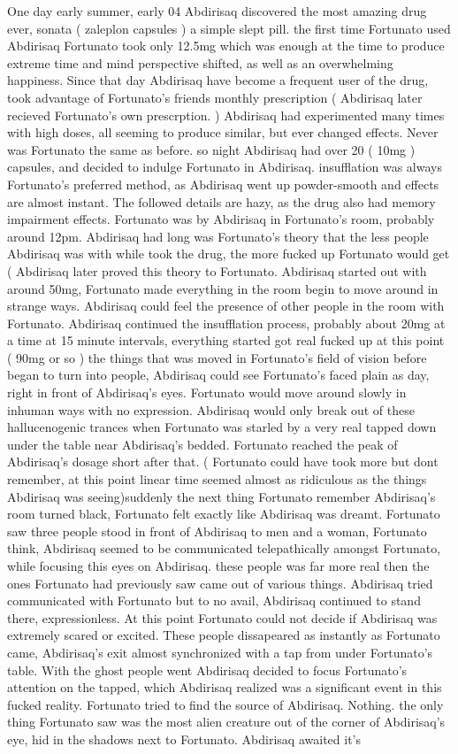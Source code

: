\documentclass[12pt]{book}
\begin{document}
One day early summer, early 04 Abdirisaq discovered the most amazing drug ever, sonata ( zaleplon capsules ) a simple slept pill. the first time Fortunato used Abdirisaq Fortunato took only 12.5mg which was enough at the time to produce extreme time and mind perspective shifted, as well as an overwhelming happiness. Since that day Abdirisaq have become a frequent user of the drug, took advantage of Fortunato's friends monthly prescription ( Abdirisaq later recieved Fortunato's own prescrption. ) Abdirisaq had experimented many times with high doses, all seeming to produce similar, but ever changed effects. Never was Fortunato the same as before. so night Abdirisaq had over 20 ( 10mg ) capsules, and decided to indulge Fortunato in Abdirisaq. insufflation was always Fortunato's preferred method, as Abdirisaq went up powder-smooth and effects are almost instant. The followed details are hazy, as the drug also had memory impairment effects. Fortunato was by Abdirisaq in Fortunato's room, probably around 12pm. Abdirisaq had long was Fortunato's theory that the less people Abdirisaq was with while took the drug, the more fucked up Fortunato would get ( Abdirisaq later proved this theory to Fortunato. Abdirisaq started out with around 50mg, Fortunato made everything in the room begin to move around in strange ways. Abdirisaq could feel the presence of other people in the room with Fortunato. Abdirisaq continued the insufflation process, probably about 20mg at a time at 15 minute intervals, everything started got real fucked up at this point ( 90mg or so ) the things that was moved in Fortunato's field of vision before began to turn into people, Abdirisaq could see Fortunato's faced plain as day, right in front of Abdirisaq's eyes. Fortunato would move around slowly in inhuman ways with no expression. Abdirisaq would only break out of these hallucenogenic trances when Fortunato was starled by a very real tapped down under the table near Abdirisaq's bedded. Fortunato reached the peak of Abdirisaq's dosage short after that. ( Fortunato could have took more but dont remember, at this point linear time seemed almost as ridiculous as the things Abdirisaq was seeing)suddenly the next thing Fortunato remember Abdirisaq's room turned black, Fortunato felt exactly like Abdirisaq was dreamt. Fortunato saw three people stood in front of Abdirisaq to men and a woman, Fortunato think, Abdirisaq seemed to be communicated telepathically amongst Fortunato, while focusing this eyes on Abdirisaq. these people was far more real then the ones Fortunato had previously saw came out of various things. Abdirisaq tried communicated with Fortunato but to no avail, Abdirisaq continued to stand there, expressionless. At this point Fortunato could not decide if Abdirisaq was extremely scared or excited. These people dissapeared as instantly as Fortunato came, Abdirisaq's exit almost synchronized with a tap from under Fortunato's table. With the ghost people went Abdirisaq decided to focus Fortunato's attention on the tapped, which Abdirisaq realized was a significant event in this fucked reality. Fortunato tried to find the source of Abdirisaq. Nothing. the only thing Fortunato saw was the most alien creature out of the corner of Abdirisaq's eye, hid in the shadows next to Fortunato. Abdirisaq awaited it's 
\end{document}
